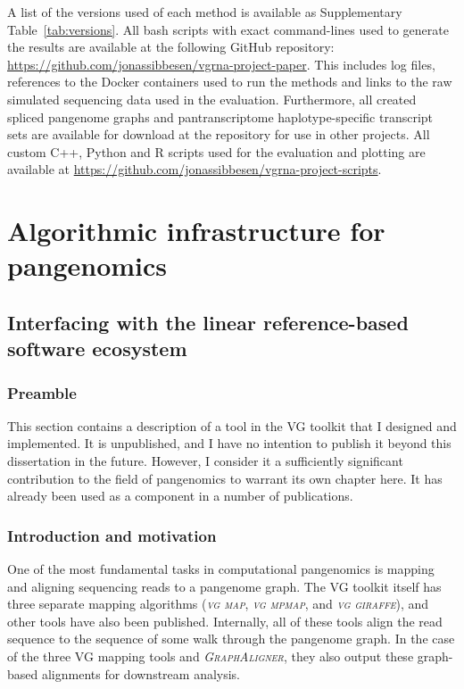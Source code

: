\documentclass[11pt]{ucthesis}
\newcommand{\tool}[1]{\emph{\textsc{#1}}}
\begin{document}
A list of the versions used of each method is available as Supplementary Table~\ref{tab:versions}. All bash scripts with exact command-lines used to generate the results are available at the following GitHub repository: \url{https://github.com/jonassibbesen/vgrna-project-paper}. This includes log files, references to the Docker containers used to run the methods and links to the raw simulated sequencing data used in the evaluation. Furthermore, all created spliced pangenome graphs and pantranscriptome haplotype-specific transcript sets are available for download at the repository for use in other projects. All custom C++, Python and R scripts used for the evaluation and plotting are available at \url{https://github.com/jonassibbesen/vgrna-project-scripts}. 


\part{Algorithmic infrastructure for pangenomics}

\chapter{Interfacing with the linear reference-based software ecosystem}
\label{chapter:surject}

\section{Preamble}

This section contains a description of a tool in the VG toolkit that I designed and implemented. It is unpublished, and I have no intention to publish it beyond this dissertation in the future. However, I consider it a sufficiently significant contribution to the field of pangenomics to warrant its own chapter here. It has already been used as a component in a number of publications\cite{grytten2019graph,groza2020personalized,crysnanto2020bovine,martiniano2020removing,siren2020genotyping}.

\section{Introduction and motivation}

One of the most fundamental tasks in computational pangenomics is mapping and aligning sequencing reads to a pangenome graph. The VG toolkit itself has three separate mapping algorithms (\tool{vg map}\cite{garrison2018variation}, \tool{vg mpmap}\cite{sibbesen2021haplotype}, and \tool{vg giraffe}\cite{siren2020genotyping}), and other tools have also been published\cite{kim2019graph,rakocevic2019fast,rautiainen2020graphaligner}. Internally, all of these tools align the read sequence to the sequence of some walk through the pangenome graph. In the case of the three VG mapping tools and \tool{GraphAligner}\cite{rautiainen2020graphaligner}, they also output these graph-based alignments for downstream analysis.
\end{document}
